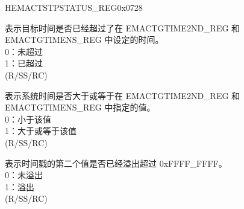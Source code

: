 \begin{register}{H}{EMACTSTPSTATUS\_REG}{0x0728}\label{regdesc:EMACTIMESTAMPSTATUSREG}
%
%
%
%
%
\regnewline%
\begin{regdesc}\begin{reglist}
\item [TSTRGTERR] 表示目标时间是否已经超过了在 EMACTGTIME2ND\_REG 和 EMACTGTIMENS\_REG 中设定的时间。\\
0：未超过\\
1：已超过\\ (R/SS/RC)
\item [TSTARGT] 表示系统时间是否大于或等于在 EMACTGTIME2ND\_REG 和 EMACTGTIMENS\_REG 中指定的值。\\
0：小于该值\\
1：大于或等于该值\\ (R/SS/RC)
\item [TSSOVF] 表示时间戳的第二个值是否已经溢出超过 0xFFFF\_FFFF。\\
0：未溢出\\
1：溢出\\ (R/SS/RC)
\end{reglist}\end{regdesc}
\end{register}
